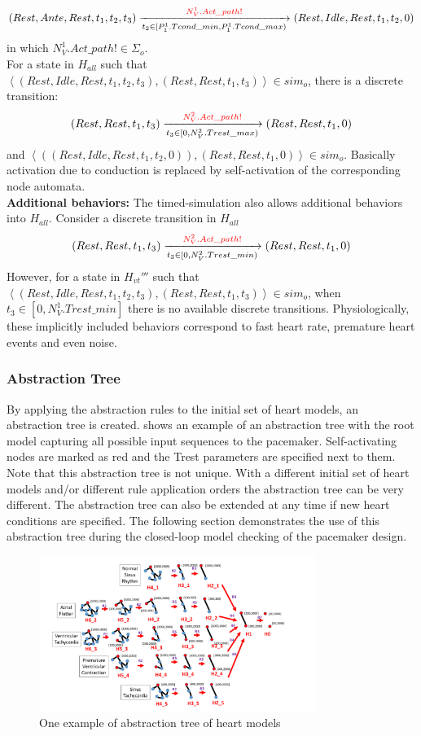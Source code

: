 $$(Rest,Ante,Rest,t_1,t_2,t_3)\xrightarrow[t_2\in [P^1_1.Tcond\_min, P^1_1.Tcond\_max) ]{\textcolor{red}{N^1_V.Act\_path!}}(Rest,Idle,Rest,t_1,t_2,0)$$
in which $N^1_V.Act\_path!\in\Sigma_o$. \\
For a state in $H_{all}$ such that $\left\langle (Rest,Idle,Rest,t_1,t_2,t_3) ,(Rest,Rest,t_1,t_3)\right\rangle\in sim_o$,  there is a discrete transition:
$$(Rest,Rest,t_1,t_3)\xrightarrow[t_3\in [0, N^2_V.Trest\_max)]{\textcolor{red}{N^2_V.Act\_path!}}(Rest,Rest,t_1,0)$$
and $\left\langle ((Rest,Idle,Rest,t_1,t_2,0)),(Rest,Rest,t_1,0)\right\rangle\in sim_o$. Basically activation due to conduction is replaced by self-activation of the corresponding node automata.\\
\textbf{Additional behaviors: }The timed-simulation also allows additional behaviors into $H_{all}$. Consider a discrete transition in $H_{all}$
$$(Rest,Rest,t_1,t_3)\xrightarrow[t_3\in [0, N^2_V.Trest\_min)]{\textcolor{red}{N^2_V.Act\_path!}}(Rest,Rest,t_1,0)$$
However, for a state in $H_{vt}'''$ such that $\left\langle (Rest,Idle,Rest,t_1,t_2,t_3),(Rest,Rest,t_1,t_3)\right\rangle\in sim_o$, when $t_3\in [0, N^1_V.Trest\_min]$ there is no available discrete transitions. Physiologically, these implicitly included behaviors correspond to fast heart rate, premature heart events and even noise.



\subsubsection{Abstraction Tree}
By applying the abstraction rules to the initial set of heart models, an abstraction tree is created.
 shows an example of an abstraction tree with the root model capturing all possible input sequences to the pacemaker.
Self-activating nodes are marked as red and the Trest parameters are specified next to them.
Note that this abstraction tree is not unique.
With a different initial set of heart models and/or different rule application orders the abstraction tree can be very different.
The abstraction tree can also be extended at any time if new heart conditions are specified.
The following section demonstrates the use of this abstraction tree during the closed-loop model checking of the pacemaker design.

 \begin{figure}[!t]
	\centering
	\includegraphics[width=0.8\textwidth]{figs/abs_tree.pdf}
	\caption{\small One example of abstraction tree of heart models}
	\label{fig:HM_abs}
\end{figure}


